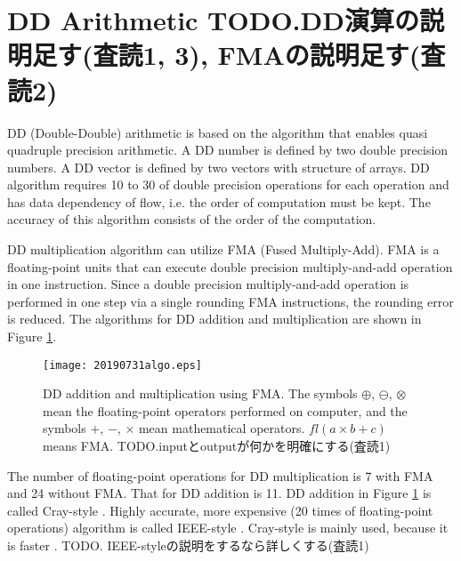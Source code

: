 \documentclass{IOS-Book-Article}
\begin{document}
\section{DD Arithmetic TODO.DD演算の説明足す(査読1, 3), FMAの説明足す(査読2)}

DD (Double-Double) arithmetic \cite{DD} is based on the algorithm that enables quasi quadruple precision arithmetic.
A DD number is defined by two double precision numbers. A DD vector is defined by two vectors with structure of arrays.
DD algorithm requires 10 to 30 of double precision operations for each operation and has data dependency of flow, i.e. the order of computation must be kept. The accuracy of this algorithm consists of the order of the computation. 

DD multiplication algorithm \cite{QD} can utilize FMA (Fused Multiply-Add). 
FMA is a floating-point units that can execute double precision multiply-and-add operation in one instruction. Since a double precision multiply-and-add operation is performed in one step via a single rounding FMA instructions, the rounding error is reduced. 
The algorithms for DD addition and multiplication are shown in Figure \ref{fig1}.

\begin{figure}[htbp]
  \begin{center}
    \texttt{[image: 20190731algo.eps]}
    \caption{DD addition and multiplication using FMA. The symbols $\oplus$, $\ominus$, $\otimes$ mean the floating-point operators performed on computer, and the symbols $+$, $-$, $\times$ mean mathematical operators. 
$fl(a\times b+c)$ means FMA. TODO.inputとoutputが何かを明確にする(査読1)}
\label{fig1}
  \end{center}
\end{figure}

The number of floating-point operations for DD multiplication is 7 with FMA and 24 without FMA.
That for DD addition is 11. DD addition in Figure \ref{fig1} is called Cray-style \cite{ichi}. Highly accurate, more expensive (20 times of floating-point operations) algorithm is called IEEE-style \cite{ichi}. Cray-style is mainly used, because it is faster \cite{DDBLAS}. TODO. IEEE-styleの説明をするなら詳しくする(査読1)
\end{document}
